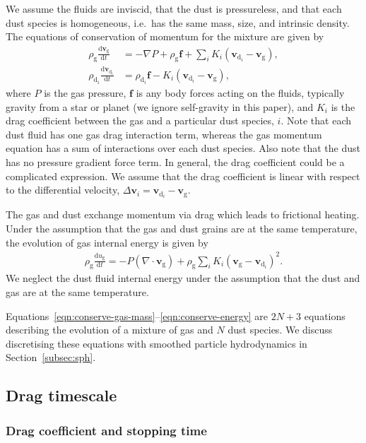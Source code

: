 \documentclass[fleqn,usenatbib]{mnras}
\newcommand{\g}{\mathrm{g}}
\newcommand{\dd}{\mathrm{d}}
\let\vec\bm
\begin{document}
We assume the fluids are inviscid, that the dust is pressureless, and that each
dust species is homogeneous, i.e.\ has the same mass, size, and intrinsic
density. The equations of conservation of momentum for the mixture are given by
%
\begin{align}
   \rho_{\g} \frac{\dd \vec{v}_{\g}}{\dd t}
      &= - \nabla P + \rho_{\g} \vec{f} + \sum_i K_i \left(\vec{v}_{\dd_i}
         - \vec{v}_{\g}\right), \\
   \rho_{\dd_i} \frac{\dd \vec{v}_{\dd_i}}{\dd t}
      &= \rho_{\dd_i} \vec{f} - K_i \left(\vec{v}_{\dd_i} - \vec{v}_{\g}\right),
\end{align}
%
where \(P\) is the gas pressure, \(\vec{f}\) is any body forces acting on the
fluids, typically gravity from a star or planet (we ignore self-gravity in this
paper), and \(K_i\) is the drag coefficient between the gas and a particular
dust species, \(i\). Note that each dust fluid has one gas drag interaction
term, whereas the gas momentum equation has a sum of interactions over each dust
species. Also note that the dust has no pressure gradient force term. In
general, the drag coefficient could be a complicated expression. We assume that
the drag coefficient is linear with respect to the differential velocity,
\(\Delta \vec{v}_i = \vec{v}_{\dd_i} - \vec{v}_{\g} \).

The gas and dust exchange momentum via drag which leads to frictional heating.
Under the assumption that the gas and dust grains are at the same temperature,
the evolution of gas internal energy is given by
%
\begin{align}
   \label{eqn:conserve-energy}
   \rho_{\g} \frac{\dd u_{\g}}{\dd t} =
      - P \left(\nabla \cdot \vec{v}_{\g}\right)
      + \rho_{\g} \sum_i K_i {(\vec{v}_{\g} - \vec{v}_{\dd_i})}^2.
\end{align}
%
We neglect the dust fluid internal energy under the assumption that the dust and
gas are at the same temperature.

Equations~\ref{eqn:conserve-gas-mass}--\ref{eqn:conserve-energy} are \(2N + 3\)
equations describing the evolution of a mixture of gas and \(N\) dust species.
We discuss discretising these equations with smoothed particle hydrodynamics in
Section~\ref{subsec:sph}.

\subsection{Drag timescale}

\subsubsection{Drag coefficient and stopping time}
\end{document}

